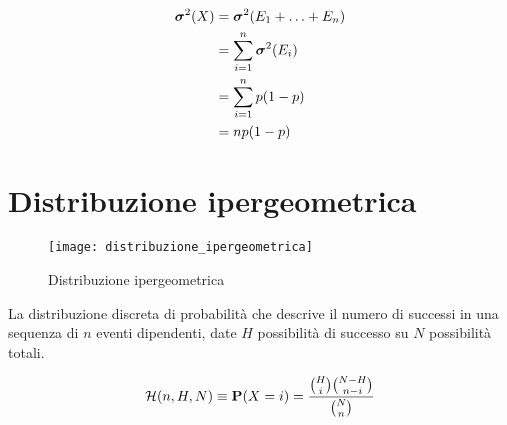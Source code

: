 \begin{proposition}
  \begin{align*}
    \boldsymbol\sigma^2(X) &= \boldsymbol\sigma^2(E_1 + \ldots + E_n) \\
    &= \sum_{i = 1}^n \boldsymbol\sigma^2(E_i) \\
    &= \sum_{i = 1}^n p (1 - p) \\
    &= n p (1 - p)
  \end{align*}
\end{proposition}



\section{Distribuzione ipergeometrica} %
\begin{figure*}
  \texttt{[image: distribuzione\_ipergeometrica]}
  \caption{Distribuzione ipergeometrica}
\end{figure*}

\begin{definition}
  \label{def:distribuzione_ipergeometrica}
  La distribuzione discreta di probabilità che descrive il numero di successi in una sequenza di  \( n \) eventi dipendenti, date \( H \) possibilità di successo su \( N \) possibilità totali.

  \[ \mathcal{H}(n, H, N) \equiv \mathbf{P}(X = i) = \frac{\binom{H}{i} \binom{N-H}{n-i}}{\binom{N}{n}} \]
\end{definition}


